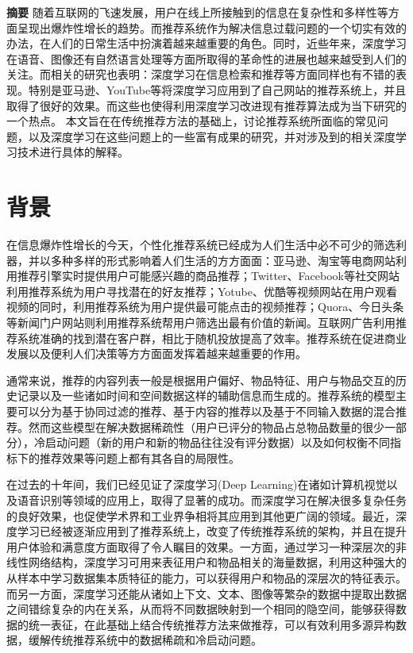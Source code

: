 

\centerline{\textbf{}}
\bigskip

\textbf{摘要}\quad 
随着互联网的飞速发展，用户在线上所接触到的信息在复杂性和多样性等方面呈现出爆炸性增长的趋势。而推荐系统作为解决信息过载问题的一个切实有效的办法，在人们的日常生活中扮演着越来越重要的角色。同时，近些年来，深度学习在语音、图像还有自然语言处理等方面所取得的革命性的进展也越来越受到人们的关注。而相关的研究也表明：深度学习在信息检索和推荐等方面同样也有不错的表现。特别是亚马逊、YouTube等将深度学习应用到了自己网站的推荐系统上\cite{CovingtonAS16YouTube}，并且取得了很好的效果。而这些也使得利用深度学习改进现有推荐算法成为当下研究的一个热点。
本文旨在在传统推荐方法的基础上，讨论推荐系统所面临的常见问题，以及深度学习在这些问题上的一些富有成果的研究，并对涉及到的相关深度学习技术进行具体的解释。


\chapter{背景}
在信息爆炸性增长的今天，个性化推荐系统已经成为人们生活中必不可少的筛选利器，并以多种多样的形式影响着人们生活的方方面面：亚马逊、淘宝等电商网站利用推荐引擎实时提供用户可能感兴趣的商品推荐；Twitter、Facebook等社交网站利用推荐系统为用户寻找潜在的好友推荐；Yotube、优酷等视频网站在用户观看视频的同时，利用推荐系统为用户提供最可能点击的视频推荐；Quora、今日头条等新闻门户网站则利用推荐系统帮用户筛选出最有价值的新闻。互联网广告利用推荐系统准确的找到潜在客户群，相比于随机投放提高了效率。推荐系统在促进商业发展以及便利人们决策等方方面面发挥着越来越重要的作用。

通常来说，推荐的内容列表一般是根据用户偏好、物品特征、用户与物品交互的历史记录以及一些诸如时间和空间数据这样的辅助信息而生成的。推荐系统的模型主要可以分为基于协同过滤的推荐、基于内容的推荐以及基于不同输入数据的混合推荐\cite{AdomaviciusT05}。然而这些模型在解决数据稀疏性（用户已评分的物品占总物品数量的很少一部分），冷启动问题（新的用户和新的物品往往没有评分数据）以及如何权衡不同指标下的推荐效果等问题上都有其各自的局限性。\cite{AdomaviciusT05}\cite{VekariyaK12Hybrid}\cite{McNeeRK06Being}\cite{VargasC11Rank}

在过去的十年间，我们已经见证了深度学习(Deep Learning)在诸如计算机视觉以及语音识别等领域的应用上，取得了显著的成功。而深度学习在解决很多复杂任务的良好效果，也促使学术界和工业界争相将其应用到其他更广阔的领域。最近，深度学习已经被逐渐应用到了推荐系统上\cite{CovingtonAS16YouTube}\cite{ChengKHSCAACCIA16Wide&Deep}，改变了传统推荐系统的架构，并且在提升用户体验和满意度方面取得了令人瞩目的效果。一方面，通过学习一种深层次的非线性网络结构，深度学习可用来表征用户和物品相关的海量数据，利用这种强大的从样本中学习数据集本质特征的能力，可以获得用户和物品的深层次的特征表示。而另一方面，深度学习还能从诸如上下文、文本、图像等繁杂的数据中提取出数据之间错综复杂的内在关系，从而将不同数据映射到一个相同的隐空间，能够获得数据的统一表征\cite{PengZZXHLZHG17Cross-Media}，在此基础上结合传统推荐方法来做推荐，可以有效利用多源异构数据，缓解传统推荐系统中的数据稀疏和冷启动问题。

